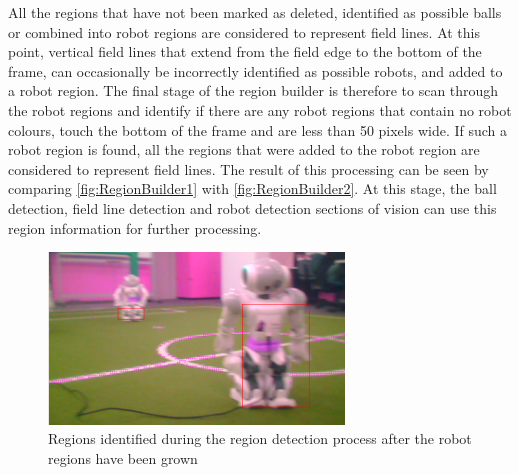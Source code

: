 \documentclass[pdftex,11pt,a4paper]{report}
\begin{document}
All the regions that have not been marked as deleted, identified as possible balls or combined into robot regions are considered to represent field lines. At this point, vertical field lines that extend from the field edge to the bottom of the frame, can occasionally be incorrectly identified as possible robots, and added to a robot region. The final stage of the region builder is therefore to scan through the robot regions and identify if there are any robot regions that contain no robot colours, touch the bottom of the frame and are less than 50 pixels wide. If such a robot region is found, all the regions that were added to the robot region are considered to represent field lines. The result of this processing can be seen by comparing \autoref{fig:RegionBuilder1} with \autoref{fig:RegionBuilder2}. At this stage, the ball detection, field line detection and robot detection sections of vision can use this region information for further processing.

\begin{figure} [t]
\centering
\includegraphics[width=0.7\textwidth]{figures/regionScreenshot2.png}
\caption{Regions identified during the region detection process after the robot regions have been grown} \label{fig:RegionBuilder2}
\end{figure}
\end{document}
